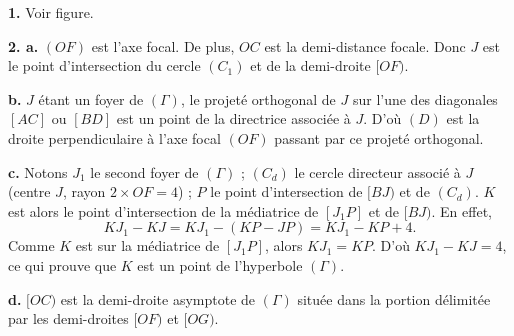 \documentclass[11pt]{article}
\begin{document}

\begin{center}
\end{center}

\textbf{1.} Voir figure.

\textbf{2. a.} $(OF)$ est l'axe focal. De plus, $OC$ est la demi-distance focale. Donc $J$ est le point d'intersection du cercle $(C_1)$ et de la demi-droite $[OF)$.

\textbf{b.} $J$ étant un foyer de $(\Gamma)$, le projeté orthogonal de $J$ sur l'une des diagonales $[AC]$ ou $[BD]$ est un point de la directrice associée à $J$. D'où $(D)$ est la droite perpendiculaire à l'axe focal $(OF)$ passant par ce projeté orthogonal.

\textbf{c.} Notons $J_1$ le second foyer de $(\Gamma)$ ; $(C_d)$ le cercle directeur associé à $J$ (centre $J$, rayon $2 \times OF = 4$) ; $P$ le point d'intersection de $[BJ)$ et de $(C_d)$. $K$ est alors le point d'intersection de la médiatrice de $[J_1 P]$ et de $[BJ)$. En effet,
\[ KJ_1 - KJ = KJ_1 - (KP - JP) = KJ_1 - KP + 4. \]
Comme $K$ est sur la médiatrice de $[J_1 P]$, alors $KJ_1 = KP$. D'où $KJ_1 - KJ = 4$, ce qui prouve que $K$ est un point de l'hyperbole $(\Gamma)$.

\textbf{d.} $[OC)$ est la demi-droite asymptote de $(\Gamma)$ située dans la portion délimitée par les demi-droites $[OF)$ et $[OG)$.
\end{document}
